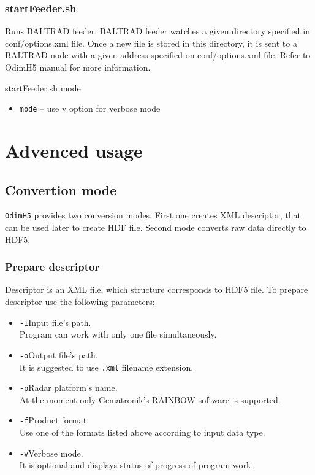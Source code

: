 \documentclass[11p]{article}
\begin{document}
\subsubsection*{startFeeder.sh} 

Runs BALTRAD feeder. BALTRAD feeder watches a given
directory specified in conf/options.xml file. Once a new file is stored
                  in this directory, it is sent to a BALTRAD node with a given
                  address specified on conf/options.xml file. Refer to OdimH5
                  manual for more information.

\begin{kod}
startFeeder.sh mode
\end{kod}
\begin{itemize}
    \item \texttt{mode} -- use v option for verbose mode
\end{itemize}

\section{Advenced usage}

\subsection{Convertion mode}

\texttt{OdimH5} provides two conversion modes. First one creates XML descriptor,
that can be used later to create HDF file. Second mode converts raw data
directly to HDF5.

\subsubsection*{Prepare descriptor}

Descriptor is an XML file, which structure corresponds to HDF5 file. To prepare
descriptor use the following parameters:
\begin{itemize}
  \renewcommand{\labelitemi}{ }
  \item \texttt{-i}\hspace{0.5cm}Input file's path.\\Program can work with
  only one file simultaneously.
  \item \texttt{-o}\hspace{0.5cm}Output file's path.\\It is suggested to use
  \texttt{.xml} filename extension.
  \item \texttt{-p}\hspace{0.5cm}Radar platform's name.\\At the moment only
  Gematronik's RAINBOW software is supported.
  \item \texttt{-f}\hspace{0.5cm}Product format.\\Use one of the formats
  listed above according to input data type.
  \item \texttt{-v}\hspace{0.5cm}Verbose mode.\\It is optional and displays
  status of progress of program work.
\end{itemize}
\end{document}
